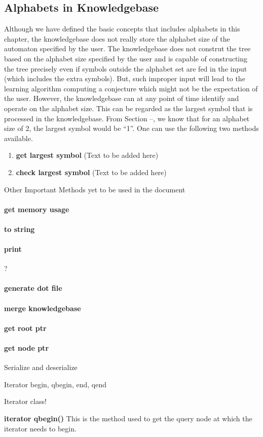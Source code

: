 \subsection{Alphabets in Knowledgebase}
	Although we have defined the basic concepts that includes alphabets in this chapter, the knowledgebase does not really store the alphabet size of the automaton specified by the user. The knowledgebase does not construt the tree based on the alphabet size specified by the user and is capable of constructing the tree precisely even if symbols outside the alphabet set are fed in the input (which includes the extra symbols). But, such improper input will lead to the learning algorithm computing a conjecture which might not be the expectation of the user.
	However, the knowledgebase can at any point of time identify and operate on the alphabet size. This can be regarded as the largest symbol that is processed in the knowledgebase. From Section --, we know that for an alphabet size of 2, the largest symbol would be ``1''.
One can use the following two methods available.
\begin{enumerate}
\item \textbf{get largest symbol} \hfill \vskip 1pt
	(Text to be added here)
\item \textbf{check largest symbol} \hfill \vskip 1pt
	(Text to be added here)
\end{enumerate}



Other Important Methods yet to be used in the document

\paragraph{get memory usage}
\paragraph{to string}
\paragraph{print} ?
\paragraph{generate dot file}
\paragraph{merge knowledgebase}
\paragraph{get root ptr}
\paragraph{get node ptr}


Serialize and deserialize

Iterator
begin, qbegin, end, qend

Iterator class!

\textbf{iterator qbegin()}
	This is the method used to get the query node at which the iterator needs to begin. 




